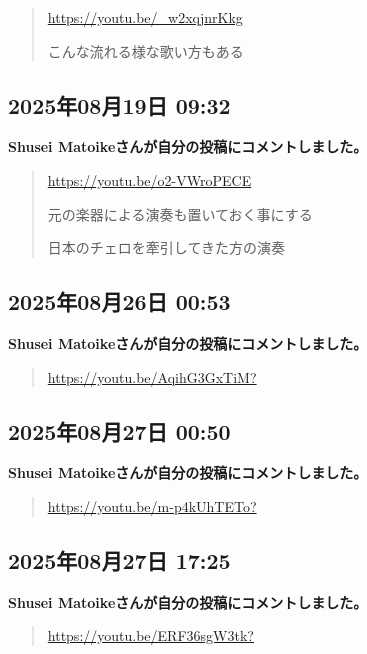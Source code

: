 \begin{quote}
\url{https://youtu.be/_w2xqjnrKkg}

こんな流れる様な歌い方もある
\end{quote}

\subsection*{2025年08月19日 09:32}

\textbf{Shusei Matoikeさんが自分の投稿にコメントしました。}

\begin{quote}
\url{https://youtu.be/o2-VWroPECE}

元の楽器による演奏も置いておく事にする

日本のチェロを牽引してきた方の演奏
\end{quote}

\subsection*{2025年08月26日 00:53}

\textbf{Shusei Matoikeさんが自分の投稿にコメントしました。}

\begin{quote}
\url{https://youtu.be/AqihG3GxTiM?}
\end{quote}

\subsection*{2025年08月27日 00:50}

\textbf{Shusei Matoikeさんが自分の投稿にコメントしました。}

\begin{quote}
\url{https://youtu.be/m-p4kUhTETo?}
\end{quote}

\subsection*{2025年08月27日 17:25}

\textbf{Shusei Matoikeさんが自分の投稿にコメントしました。}

\begin{quote}
\url{https://youtu.be/ERF36sgW3tk?}
\end{quote}

